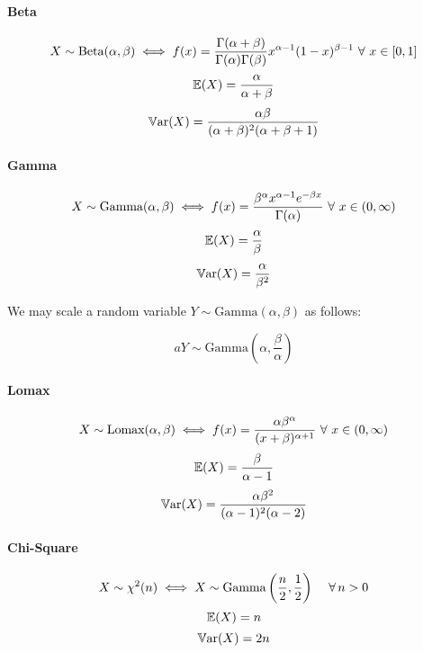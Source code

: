 \documentclass[a4paper]{article}
\begin{document}
            \paragraph{Beta}
                \[
                    X \sim \text{Beta}(\alpha, \beta) \iff f(x) =
                    \frac{\Gamma(\alpha + \beta)}{\Gamma(\alpha)\Gamma(\beta)}
                    x^{\alpha - 1}(1 - x)^{\beta - 1} \,\,\forall\,\, x \in [0, 1]
                \]
                \[
                    \mathbb{E}(X) = \frac{\alpha}{\alpha + \beta}
                \]
                \[
                    \mathbb{V}\text{ar}(X) = \frac{\alpha\beta}{(\alpha + \beta)^2(\alpha +
                    \beta + 1)}
                \]

            \paragraph{Gamma}
                \[
                    X \sim \text{Gamma}(\alpha, \beta) \iff f(x) =
                    \frac{\beta^\alpha x^{\alpha - 1}e^{-\beta x}}
                    {\Gamma(\alpha)} \,\,\forall\,\, x \in (0, \infty)
                \]
                \[
                    \mathbb{E}(X) = \frac{\alpha}{\beta}
                \]
                \[
                    \mathbb{V}\text{ar}(X) = \frac{\alpha}{\beta^2}
                \]

                We may scale a random variable $Y \sim \text{Gamma}(\alpha,
                \beta)$ as follows:

                \[
                    aY \sim \text{Gamma}\left(\alpha, \frac{\beta}{\alpha}
                    \right)
                \]

            \paragraph{Lomax}
                \[
                    X \sim \text{Lomax}(\alpha, \beta) \iff f(x) =
                    \frac{\alpha\beta^\alpha}{(x + \beta)^{\alpha + 1}} \,\,\forall\,\,
                    x \in (0, \infty)
                \]
                \[
                    \mathbb{E}(X) = \frac{\beta}{\alpha - 1}
                \]
                \[
                    \mathbb{V}\text{ar}(X) = \frac{\alpha\beta^2}{(\alpha - 1)^2(\alpha - 2)}
                \]

            \paragraph{Chi-Square}
                \[
                    X \sim \chi^2(n) \iff X \sim \text{Gamma}\left(\frac{n}{2},
                    \frac{1}{2}\right) \quad \,\forall\, n > 0
                \]
                \[
                    \mathbb{E}(X) = n
                \]
                \[
                    \mathbb{V}\text{ar}(X) = 2n
                \]
\end{document}
